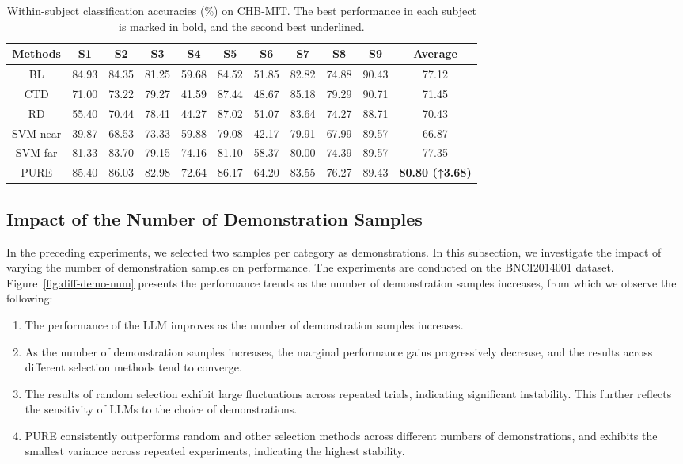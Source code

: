 \documentclass[journal,twocolumn]{IEEEtran}
\begin{document}
\begin{table}[htpb] \centering
  \caption{Within-subject classification accuracies (\%) on CHB-MIT. The best performance in each subject is marked in bold, and the second best underlined.}
  \label{tab:chb-mit-result}
  \begin{tabular}{c|c|c|c|c|c|c|c|c|c|c}
  \toprule
  Methods & S1 & S2 & S3 & S4 & S5 & S6 & S7 & S8 & S9 & Average \\
  \midrule
  BL & 84.93 & 84.35 & 81.25 & 59.68 & 84.52 & 51.85 & 82.82 & 74.88 & 90.43 & 77.12 \\
  CTD & 71.00 & 73.22 & 79.27 & 41.59 & 87.44 & 48.67 & 85.18 & 79.29 & 90.71 & 71.45 \\
  RD & 55.40 & 70.44 & 78.41 & 44.27 & 87.02 & 51.07 & 83.64 & 74.27 & 88.71 & 70.43 \\
  SVM-near & 39.87 & 68.53 & 73.33 & 59.88 & 79.08 & 42.17 & 79.91 & 67.99 & 89.57 & 66.87 \\
  SVM-far & 81.33 & 83.70 & 79.15 & 74.16 & 81.10 & 58.37 & 80.00 & 74.39 & 89.57 & \underline{77.35} \\
  PURE & 85.40 & 86.03 & 82.98 & 72.64 & 86.17 & 64.20 & 83.55 & 76.27 & 89.43 & \textbf{80.80 (↑3.68)} \\
  \bottomrule
  \end{tabular}
\end{table}

\subsection{Impact of the Number of Demonstration Samples}
In the preceding experiments, we selected two samples per category as demonstrations. In this subsection, we investigate the impact of varying the number of demonstration samples on performance. The experiments are conducted on the BNCI2014001 dataset. Figure~\ref{fig:diff-demo-num} presents the performance trends as the number of demonstration samples increases, from which we observe the following:
\begin{enumerate}
  \item The performance of the LLM improves as the number of demonstration samples increases.
  \item As the number of demonstration samples increases, the marginal performance gains progressively decrease, and the results across different selection methods tend to converge.
  \item The results of random selection exhibit large fluctuations across repeated trials, indicating significant instability. This further reflects the sensitivity of LLMs to the choice of demonstrations.
  \item PURE consistently outperforms random and other selection methods across different numbers of demonstrations, and exhibits the smallest variance across repeated experiments, indicating the highest stability.
\end{enumerate}
\end{document}
